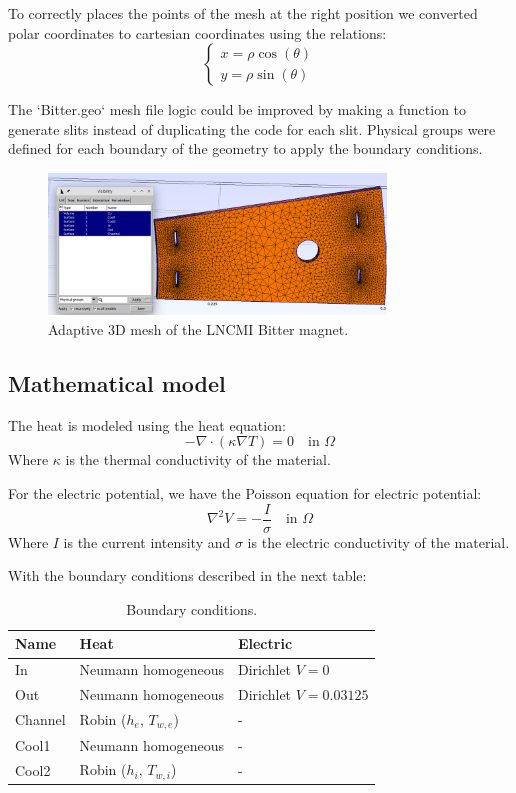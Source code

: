 \documentclass[12pt]{article}
\begin{document}
To correctly places the points of the mesh at the right position we converted polar
coordinates to cartesian coordinates using the relations:
$$
\begin{cases}
	x = \rho \cos(\theta) \\
	y = \rho \sin(\theta)
\end{cases}
$$

The `Bitter.geo` mesh file logic could be improved by making a function to generate slits 
instead of duplicating the code for each slit. 
Physical groups were defined for each boundary of the geometry to apply the boundary conditions.



\begin{figure}[H]
	\centering
	\includegraphics[width=0.8\textwidth]{images/bitter_mesh.png}
	\caption{Adaptive 3D mesh of the LNCMI Bitter magnet.}
\end{figure}

\subsection{Mathematical model}
The heat is modeled using the heat equation:
$$
	-\nabla \cdot (\kappa \nabla T) = 0 \quad \text{in } \Omega 
$$
Where $\kappa$ is the thermal conductivity of the material.

For the electric potential, we have the Poisson equation for electric potential:
$$
	\nabla^2 V = -\frac{I}{\sigma} \quad \text{in } \Omega
$$
Where $I$ is the current intensity and $\sigma$ is the electric conductivity of the material.  

With the boundary conditions described in the next table: 

\begin{table}[H]
	\centering
	\begin{tabular}{|l|l|l|}
	\hline
	\textbf{Name} & \textbf{Heat} & \textbf{Electric} \\ \hline
	In & Neumann homogeneous & Dirichlet $V = 0$ \\ \hline
	Out & Neumann homogeneous & Dirichlet $V = 0.03125$ \\ \hline
	Channel & Robin ($h_e$, $T_{w,e}$) & - \\ \hline
	Cool1 & Neumann homogeneous & - \\ \hline
	Cool2 & Robin ($h_i$, $T_{w,i}$) & - \\ \hline
	\end{tabular}
	\caption{Boundary conditions.}
	\label{tab:boundary_conditions}
\end{table}
\end{document}
